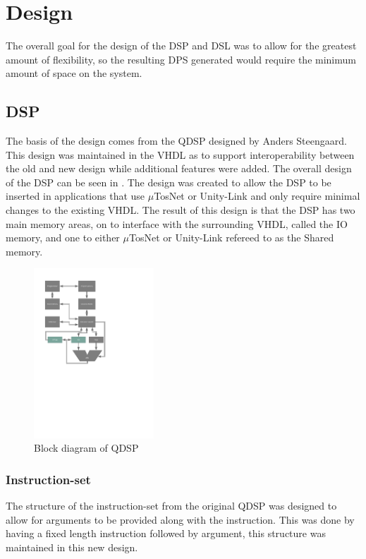\chapter{Design}
The overall goal for the design of the DSP and DSL was to allow for the greatest amount of flexibility, so the resulting DPS generated would require the minimum amount of space on the system.


\section{DSP}
The basis of the design comes from the QDSP designed by Anders Steengaard. This design was maintained in the VHDL as to support interoperability between the old and new design while additional features were added. The overall design of the DSP can be seen in . The design was created to allow the DSP to be inserted in applications that use $\mu$TosNet or Unity-Link and only require minimal changes to the existing VHDL. The result of this design is that the DSP has two main memory areas, on to interface with the surrounding VHDL, called the IO memory, and one to either $\mu$TosNet or Unity-Link refereed to as the Shared memory.

\begin{figure}[h]
	\centering
		\includegraphics[width=0.40\textwidth]{../includes/pictures/DSPDiagram.pdf}
	\caption{Block diagram of QDSP}
	\label{fig:DSPDiagram}
\end{figure}

\subsection{Instruction-set}
The structure of the instruction-set from the original QDSP was designed to allow for arguments to be provided along with the instruction. This was done by having a fixed length instruction followed by argument, this structure was maintained in this new design.

